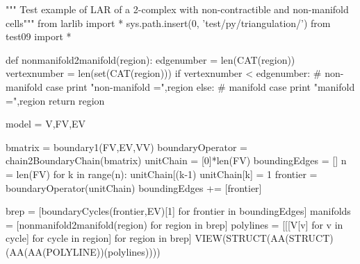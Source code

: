 """ Test example of LAR of a 2-complex with non-contractible and non-manifold cells"""
from larlib import *
sys.path.insert(0, 'test/py/triangulation/')
from test09 import *

def nonmanifold2manifold(region):
    edgenumber = len(CAT(region))
    vertexnumber = len(set(CAT(region)))
    if vertexnumber < edgenumber:
        # non-manifold case
        print "non-manifold =",region
    else:
        # manifold case
        print "manifold =",region
        return region    

model = V,FV,EV

bmatrix = boundary1(FV,EV,VV)
boundaryOperator = chain2BoundaryChain(bmatrix)
unitChain = [0]*len(FV)
boundingEdges = []
n = len(FV)
for k in range(n):
	unitChain[(k-1)%
	unitChain[k] = 1
	frontier = boundaryOperator(unitChain)
	boundingEdges += [frontier]

brep = [boundaryCycles(frontier,EV)[1] for frontier in boundingEdges]
manifolds = [nonmanifold2manifold(region) for region in brep]
polylines = [[[V[v] for v in cycle] for cycle in region] for region in brep]
VIEW(STRUCT(AA(STRUCT)(AA(AA(POLYLINE))(polylines))))



